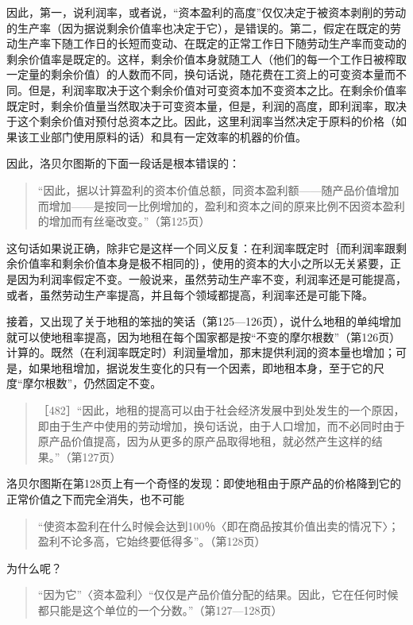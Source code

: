 因此，第一，说利润率，或者说，“资本盈利的高度”仅仅决定于被资本剥削的劳动的生产率（因为据说剩余价值率也决定于它），是错误的。第二，假定在既定的劳动生产率下随工作日的长短而变动、在既定的正常工作日下随劳动生产率而变动的剩余价值率是既定的。这样，剩余价值本身就随工人（他们的每一个工作日被榨取一定量的剩余价值）的人数而不同，换句话说，随花费在工资上的可变资本量而不同。但是，利润率取决于这个剩余价值对可变资本加不变资本之比。在剩余价值率既定时，剩余价值量当然取决于可变资本量，但是，利润的高度，即利润率，取决于这个剩余价值对预付总资本之比。因此，这里利润率当然决定于原料的价格（如果该工业部门使用原料的话）和具有一定效率的机器的价值。

因此，洛贝尔图斯的下面一段话是根本错误的：

\begin{quote}{“因此，据以计算盈利的资本价值总额，同资本盈利额——随产品价值增加而增加——是按同一比例增加的，盈利和资本之间的原来比例不因资本盈利的增加而有丝毫改变。”（第125页）}\end{quote}

这句话如果说正确，除非它是这样一个同义反复：在利润率既定时｛而利润率跟剩余价值率和剩余价值本身是极不相同的｝，使用的资本的大小之所以无关紧要，正是因为利润率假定不变。一般说来，虽然劳动生产率不变，利润率还是可能提高，或者，虽然劳动生产率提高，并且每个领域都提高，利润率还是可能下降。

接着，又出现了关于地租的笨拙的笑话（第125—126页），说什么地租的单纯增加就可以使地租率提高，因为地租在每个国家都是按“不变的摩尔根数”（第126页）计算的。既然（在利润率既定时）利润量增加，那末提供利润的资本量也增加；可是，如果地租增加，据说发生变化的只有一个因素，即地租本身，至于它的尺度“摩尔根数”，仍然固定不变。

\begin{quote}{［482］“因此，地租的提高可以由于社会经济发展中到处发生的一个原因，即由于生产中使用的劳动增加，换句话说，由于人口增加，而不必同时由于原产品价值提高，因为从更多的原产品取得地租，就必然产生这样的结果。”（第127页）}\end{quote}

洛贝尔图斯在第128页上有一个奇怪的发现：即使地租由于原产品的价格降到它的正常价值之下而完全消失，也不可能

\begin{quote}{“使资本盈利在什么时候会达到100％〈即在商品按其价值出卖的情况下〉；盈利不论多高，它始终要低得多”。（第128页）}\end{quote}

为什么呢？

\begin{quote}{“因为它”〈资本盈利〉“仅仅是产品价值分配的结果。因此，它在任何时候都只能是这个单位的一个分数。”（第127—128页）}\end{quote}

